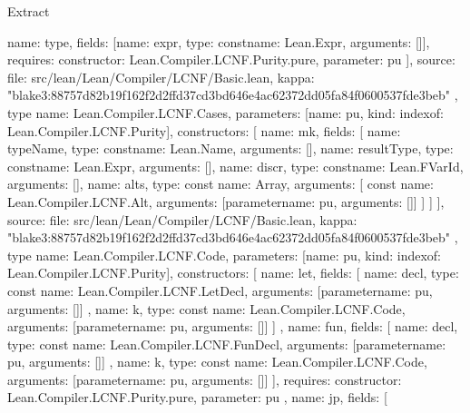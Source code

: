 \begin{lexlean}{Extract}
\begin{toolingmodule}
{{        {
          name: type,
          fields: [{name: expr, type: const{name: Lean.Expr, arguments: []}}],
          requires: {constructor: Lean.Compiler.LCNF.Purity.pure, parameter: pu}
        }
      ],
      source: {
        file: src/lean/Lean/Compiler/LCNF/Basic.lean,
        kappa: "blake3:88757d82b19f162f2d2ffd37cd3bd646e4ac62372dd05fa84f0600537fde3beb"
      }
    },
    type{
      name: Lean.Compiler.LCNF.Cases,
      parameters: [{name: pu, kind: index{of: Lean.Compiler.LCNF.Purity}}],
      constructors: [
        {
          name: mk,
          fields: [
            {name: typeName, type: const{name: Lean.Name, arguments: []}},
            {name: resultType, type: const{name: Lean.Expr, arguments: []}},
            {name: discr, type: const{name: Lean.FVarId, arguments: []}},
            {
              name: alts,
              type: const{
                name: Array,
                arguments: [
                  const{
                    name: Lean.Compiler.LCNF.Alt,
                    arguments: [parameter{name: pu, arguments: []}]
                  }
                ]
              }
            }
          ]
        }
      ],
      source: {
        file: src/lean/Lean/Compiler/LCNF/Basic.lean,
        kappa: "blake3:88757d82b19f162f2d2ffd37cd3bd646e4ac62372dd05fa84f0600537fde3beb"
      }
    },
    type{
      name: Lean.Compiler.LCNF.Code,
      parameters: [{name: pu, kind: index{of: Lean.Compiler.LCNF.Purity}}],
      constructors: [
        {
          name: let,
          fields: [
            {
              name: decl,
              type: const{
                name: Lean.Compiler.LCNF.LetDecl,
                arguments: [parameter{name: pu, arguments: []}]
              }
            },
            {
              name: k,
              type: const{
                name: Lean.Compiler.LCNF.Code,
                arguments: [parameter{name: pu, arguments: []}]
              }
            }
          ]
        },
        {
          name: fun,
          fields: [
            {
              name: decl,
              type: const{
                name: Lean.Compiler.LCNF.FunDecl,
                arguments: [parameter{name: pu, arguments: []}]
              }
            },
            {
              name: k,
              type: const{
                name: Lean.Compiler.LCNF.Code,
                arguments: [parameter{name: pu, arguments: []}]
              }
            }
          ],
          requires: {constructor: Lean.Compiler.LCNF.Purity.pure, parameter: pu}
        },
        {
          name: jp,
          fields: [
}}}
\end{toolingmodule}
\end{lexlean}
